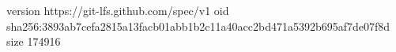 version https://git-lfs.github.com/spec/v1
oid sha256:3893ab7cefa2815a13facb01abb1b2c11a40acc2bd471a5392b695af7de07f8d
size 174916
